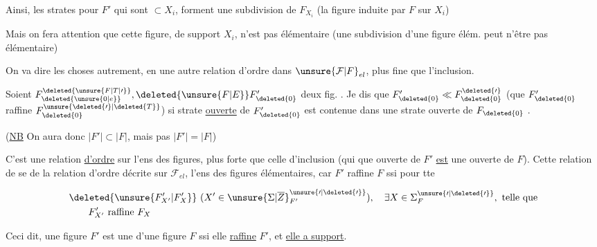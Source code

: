 Ainsi, les strates pour $F'$ qui sont $\subset X_i$, forment une  subdivision de $F_{X_i}$ (la figure  induite par $F$ sur $X_i$)

Mais on fera attention que cette figure, de support $X_i$, n'est pas  élémentaire (une subdivision d'une figure élém. peut n'être pas élémentaire)

On va dire les choses autrement, en  une autre relation d'ordre dans $\unsure{\mathcal{F}|F}_{el}$, plus fine que l'inclusion.


Soient $F_{\deleted{\unsure{0|e}}}^{\deleted{\unsure{F|T|\prime}}},\deleted{\unsure{F|E}}F_{\deleted{0}}'$ deux fig. . Je dis que $F_{\deleted{0}}'\ll F_{\deleted{0}}^{\deleted{\prime}}$ (que $F_{\deleted{0}}'$ raffine $F_{\deleted{0}}^{\unsure{\deleted{\prime}|\deleted{T}}}$) si   strate \uline{ouverte} de $F_{\deleted{0}}'$ est contenue dans une strate ouverte de $F_{\deleted{0}}$ .

(\uline{NB} On aura  donc $|F'|\subset|F|$, mais pas  $|F'|=|F|$)

C'est une relation \uline{d'ordre} sur l'ens des figures, plus forte que celle d'inclusion (qui   que   ouverte de $F'$ \uline{est} une  ouverte de $F$). Cette relation de    se   de la relation d'ordre  décrite sur $\mathcal{F}_{el}$, l'ens des figures élémentaires, car $F'$ raffine $F$ ssi pour tte

\[
\begin{aligned}
&\deleted{\unsure{F'_{X'}|F'_{X}}}\ (X'\in{\unsure{\Sigma|\overline{Z}}}^{\unsure{\prime|\deleted{\prime}}}_{F'}),\quad \exists X\in\Sigma^{\unsure{\prime|\deleted{\prime}}}_F,\ \text{telle que}\\
&\qquad F'_{X'}\ \text{raffine}\ F_X
\end{aligned}
\]

Ceci dit, une figure $F'$ est une  d'une figure $F$ ssi elle \uline{raffine} $F'$, et  \uline{elle a  support}. 

